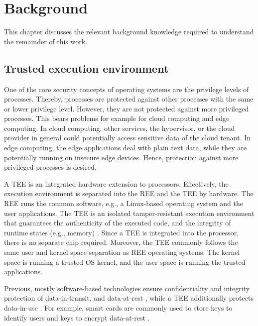 
\chapter{Background}\label{chapter:background}

This chapter discusses the relevant background knowledge required to understand the remainder of this work.

\section{Trusted execution environment}

One of the core security concepts of operating systems are the privilege levels of processes. Thereby, processes are protected against other processes with the same or lower privilege level. However, they are not protected against more privileged processes. This bears problems for example for cloud computing and edge computing. In cloud computing, other services, the hypervisor, or the cloud provider in general could potentially access sensitive data of the cloud tenant. In edge computing, the edge applications deal with plain text data, while they are potentially running on insecure edge devices. Hence, protection against more privileged processes is desired.


A \ac{TEE} is an integrated hardware extension to processors. Effectively, the execution environment is separated into the \ac{REE} and the \ac{TEE} by hardware. The \ac{REE} runs the common software, e.g., a Linux-based operating system and the user applications.
The TEE is an isolated tamper-resistant execution environment that guarantees the authenticity of the executed code, and the integrity of runtime states (e.g., memory) \cite{Sabt2015}.
Since a \ac{TEE} is integrated into the processor, there is no separate chip required.
Moreover, the \ac{TEE} commonly follows the same user and kernel space separation as \ac{REE} operating systems. The kernel space is running a trusted OS kernel, and the user space is running the trusted applications.

Previous, mostly software-based technologies ensure confidentiality and integrity protection of data-in-transit, and data-at-rest \cite{Pecholt2022}, while a \ac{TEE} additionally protects data-in-use \cite{Lee:EECS-2022-96}.
For example, smart cards are commonly used to store keys to identify users and keys to encrypt data-at-rest \cite{Arthur2015}.

